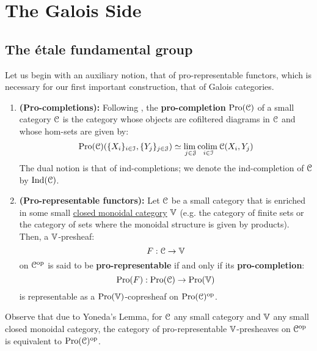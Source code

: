 \section{The Galois Side}
    \subsection{The \'etale fundamental group}
        Let us begin with an auxiliary notion, that of pro-representable functors, which is necessary for our first important construction, that of Galois categories.
        \begin{definition} \label{def: pro_representable_functors}
            \noindent
            \begin{enumerate}
                \item \textbf{(Pro-completions):} Following \cite[Definition 2.1]{isaksen_2001_limits_and_colimits_in_pro_categories}, the \textbf{pro-completion} $\mathrm{Pro}(\mathcal{C})$ of a small category $\mathcal{C}$ is the category whose objects are cofiltered diagrams in $\mathcal{C}$ and whose hom-sets are given by:
                    $$\mathrm{Pro}(\mathcal{C})(\{X_i\}_{i \in \mathcal{I}}, \{Y_j\}_{j \in \mathcal{J}}) \simeq \underset{j \in \mathcal{J}}{\operatorname{lim} \:} \underset{i \in \mathcal{I}}{\operatorname{colim} \:} \mathcal{C}(X_i, Y_j)$$
                The dual notion is that of ind-completions; we denote the ind-completion of $\mathcal{C}$ by $\mathrm{Ind}(\mathcal{C})$.
                \item \textbf{(Pro-representable functors):} Let $\mathcal{C}$ be a small category that is enriched in some small \href{http://nlab-pages.s3.us-east-2.amazonaws.com/nlab/show/closed+monoidal+category}{\underline{closed monoidal category}} $\mathbb{V}$ (e.g. the category of finite sets or the category of sets where the monoidal structure is given by products). Then, a $\mathbb{V}$-presheaf:
                    $$F: \mathcal{C} \to \mathbb{V}$$
                on $\mathcal{C}^{\mathrm{op}}$ is said to be \textbf{pro-representable} if and only if its \textbf{pro-completion}:
                    $$\mathrm{Pro}(F): \mathrm{Pro}(\mathcal{C}) \to \mathrm{Pro}(\mathbb{V})$$
                is representable as a $\mathrm{Pro}(\mathbb{V})$-copresheaf on $\mathrm{Pro}(\mathcal{C})^{\mathrm{op}}$.
            \end{enumerate}
        \end{definition}
        \begin{remark} \label{remark: pro_representable_functors_are_ind_objects}
            Observe that due to Yoneda's Lemma, for $\mathcal{C}$ any small category and $\mathbb{V}$ any small closed monoidal category, the category of pro-representable $\mathbb{V}$-presheaves on $\mathcal{C}^{\mathrm{op}}$ is equivalent to $\mathrm{Pro}(\mathcal{C})^{\mathrm{op}}$. 
        \end{remark}
        
